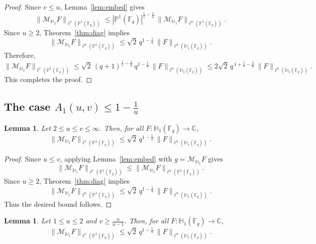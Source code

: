 \documentclass[11pt]{article}
\newtheorem{lemma}[theorem]{Lemma}
\newcommand{\1}{\mathbf 1}
\begin{document}
\begin{proof}
Since $v\le u$, Lemma~\ref{lem:embed} gives
\[
\|\mathcal{M}_{\mathbb{H}_1} F\|_{\ell^v(\mathbb{P}^1(\mathbb{F}_q))}
\le
|\mathbb{P}^1(\mathbb{F}_q)|^{\frac1v-\frac1u}\,\|\mathcal{M}_{\mathbb{H}_1} F\|_{\ell^u(\mathbb{P}^1(\mathbb{F}_q))}.
\]
Since $u\ge 2$, Theorem~\ref{thm:diag} implies
\[
\|\mathcal{M}_{\mathbb{H}_1} F\|_{\ell^u(\mathbb{P}^1(\mathbb{F}_q))}
\le \sqrt{2}
\,q^{1-\frac1u}\,\|F\|_{\ell^u(\mathbb{H}_1(\mathbb{F}_q))}.
\]
Therefore,
\[
\|\mathcal{M}_{\mathbb{H}_1} F\|_{\ell^v(\mathbb{P}^1(\mathbb{F}_q))}
\le \sqrt{2} \,(q+1)^{\frac1v-\frac1u}\,q^{1-\frac1u}\,
\|F\|_{\ell^u(\mathbb{H}_1(\mathbb{F}_q))}
\le 2\sqrt{2}\,q^{\,1+\frac1v-\frac{2}{u}}\,
\|F\|_{\ell^u(\mathbb{H}_1(\mathbb{F}_q))}.
\]
This completes the proof.
\end{proof}


\subsection{The case $A_1(u, v)\le 1-\frac{1}{u}$}

\begin{lemma}\label{thm:blue}
Let $2\le u\le v\le\infty$. Then, for all
$F:\mathbb{H}_1(\mathbb{F}_q)\to\mathbb{C}$,  
\[
\|\mathcal{M}_{\mathbb{H}_1} F\|_{\ell^v(\mathbb{P}^1(\mathbb{F}_q))}
\le  \sqrt{2} \,q^{1-\frac{1}{u}}\,
\|F\|_{\ell^u(\mathbb{H}_1(\mathbb{F}_q))}.
\]
\end{lemma}

\begin{proof}
Since $u\le v$, applying Lemma~\ref{lem:embed} with $g=\mathcal{M}_{\mathbb{H}_1} F$ gives
\[
\|\mathcal{M}_{\mathbb{H}_1} F\|_{\ell^v(\mathbb{P}^1(\mathbb{F}_q))}
\le
\|\mathcal{M}_{\mathbb{H}_1} F\|_{\ell^u(\mathbb{P}^1(\mathbb{F}_q))}.
\]
Since $u\ge 2$, Theorem~\ref{thm:diag} implies
\[
\|\mathcal{M}_{\mathbb{H}_1} F\|_{\ell^u(\mathbb{P}^1(\mathbb{F}_q))}
\le \sqrt{2} \,q^{1-\frac{1}{u}}\,
\|F\|_{\ell^u(\mathbb{H}_1(\mathbb{F}_q))}.
\]
Thus the desired bound follows.
\end{proof}


\begin{lemma}\label{thm:lower-right-1}
Let $1\le u\le 2$ and $v\ge \frac{u}{u-1}$. Then,
for all
$F:\mathbb{H}_1(\mathbb{F}_q)\to\mathbb{C}$,
\[
\|\mathcal{M}_{\mathbb{H}_1} F\|_{\ell^v(\mathbb{P}^1(\mathbb{F}_q))}
\le \sqrt{2}\,q^{1-\frac1u}\,
\|F\|_{\ell^u(\mathbb{H}_1(\mathbb{F}_q))}.
\]
\end{lemma}
\end{document}
